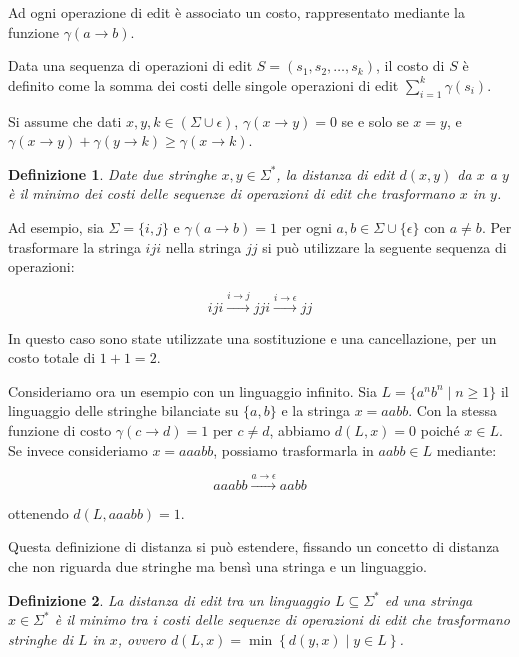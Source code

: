 \documentclass[a4paper,12pt]{report}
\newtheorem{definition}{Definizione}[chapter]
\theoremstyle{propositionstyle}
\begin{document}
    Ad ogni operazione di edit è associato un costo, rappresentato mediante la funzione $\gamma(a \rightarrow b)$.
    
    Data una sequenza di operazioni di edit $S = \left(s_1, s_2, \dots, s_k\right)$, il costo di $S$ è definito come la somma dei costi delle singole operazioni di edit
    $\sum_{i=1}^{k} \gamma(s_i)$.

    Si assume che dati $x, y, k \in \left(\Sigma \cup \epsilon\right)$, $\gamma\left(x \rightarrow y\right) = 0$ se e solo se $x = y$, e $\gamma\left(x \rightarrow y\right)
    + \gamma\left(y \rightarrow k\right) \geq \gamma\left(x \rightarrow k\right)$.

    \begin{definition}
        Date due stringhe $x, y \in \Sigma^*$, la distanza di edit $d\left(x, y\right)$ da $x$ a $y$ è il minimo dei costi delle sequenze di operazioni di edit che trasformano $x$ in $y$.
    \end{definition}
    
    Ad esempio, sia $\Sigma = \{i, j\}$ e $\gamma\left(a \rightarrow b\right) = 1$ per ogni $a, b \in \Sigma \cup \{\epsilon\}$ con $a \neq b$. Per trasformare la stringa $iji$ nella stringa $jj$ si può utilizzare la seguente sequenza di operazioni:
    
    $$iji \xrightarrow{i \rightarrow j} jji \xrightarrow{i \rightarrow \epsilon} jj$$
    
    In questo caso sono state utilizzate una sostituzione e una cancellazione, per un costo totale di $1 + 1 = 2$.
    
    Consideriamo ora un esempio con un linguaggio infinito. Sia $L = \{a^n b^n \mid n \geq 1\}$ il linguaggio delle stringhe bilanciate su $\{a, b\}$ e la stringa $x = aabb$. Con la stessa funzione di costo $\gamma(c \rightarrow d) = 1$ per $c \neq d$, abbiamo $d(L, x) = 0$ poiché $x \in L$. Se invece consideriamo $x = aaabb$, possiamo trasformarla in $aabb \in L$ mediante:
    
    $$aaabb \xrightarrow{a \rightarrow \epsilon} aabb$$
    
    ottenendo $d(L, aaabb) = 1$.

    Questa definizione di distanza si può estendere, fissando un concetto di distanza che non riguarda due stringhe ma bensì una stringa e un linguaggio.

    \begin{definition}
        La distanza di edit tra un linguaggio $L \subseteq \Sigma^*$ ed una stringa $x \in \Sigma^*$ è il minimo tra i costi delle sequenze di operazioni di edit
        che trasformano stringhe di $L$ in $x$, ovvero $d\left(L, x\right) = \min\left\{d\left(y, x\right) \mid y \in L \right\}$.
    \end{definition}
\end{document}
